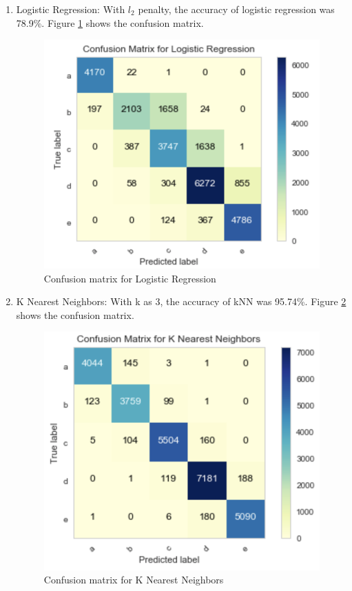 \documentclass[sigconf]{acmart}
\begin{document}
\begin{enumerate}
  \item Logistic Regression: With $l_2$ penalty, the accuracy of logistic regression was 78.9\%. Figure \ref{fig:Fig4} shows the confusion matrix. \\

\begin{figure}
\includegraphics[width=1.0\textwidth]{images/fig4.png}
\caption{Confusion matrix for Logistic Regression \cite{code-base}}
\label{fig:Fig4}
\end{figure}

  \item K Nearest Neighbors: With k as 3, the accuracy of kNN was 95.74\%. Figure \ref{fig:Fig5} shows the confusion matrix. \\

\begin{figure}
\includegraphics[width=1.0\textwidth]{images/fig5.png}
\caption{Confusion matrix for K Nearest Neighbors \cite{code-base}}
\label{fig:Fig5}
\end{figure}


\end{enumerate}
\end{document}
